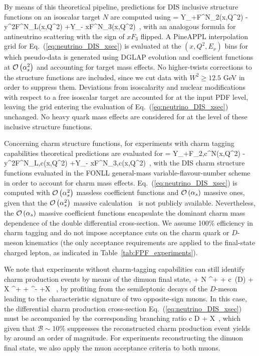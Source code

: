 By means of this theoretical pipeline, predictions for
DIS inclusive structure functions on an isoscalar target $N$ are computed
using
\be
\label{eq:neutrino_DIS_xsec}
 =  \lc Y_+F^{\nu N}_2(x,Q^2) - y^2F^{\nu N}_L(x,Q^2) +Y_- xF^{\nu N}_3(x,Q^2)\rc  \, ,
\ee
with an analogous formula for antineutrino scattering with the sign of $xF_3$ flipped.
%
A {\sc\small PineAPPL} interpolation grid for
Eq.~(\ref{eq:neutrino_DIS_xsec}) is evaluated at the $(x,Q^2,E_\nu)$ bins
for which pseudo-data is generated using DGLAP evolution and coefficient
functions at $\mathcal{O}\left( \alpha_s^2\right)$ and accounting for target mass effects.
%
No higher-twists corrections to the structure functions are included, since we cut
data with $W^2 \ge 12.5$ GeV in order to suppress them.
%
Deviations from isoscalarity and nuclear modifications with respect
to a free isoscalar target are accounted for at the input PDF level,
leaving the grid entering the evaluation of Eq.~(\ref{eq:neutrino_DIS_xsec}) unchanged.
%
No heavy quark mass effects are considered for at the level of these inclusive structure functions.

Concerning charm structure functions, for experiments with charm tagging
capabilities theoretical predictions are evaluated for
\be
\label{eq:neutrino_DIS_xsec}
 =  \lc Y_+F_{2,c}^{\nu N}(x,Q^2) - y^2F^{\nu N}_{L,c}(x,Q^2) +Y_- xF^{\nu N}_{3,c}(x,Q^2)\rc  \, ,
\ee
with the DIS charm structure functions evaluated in the FONLL general-mass variable-flavour-number
scheme~\cite{Forte:2010ta,Ball:2011mu,Faura:2020oom} in order to account for charm mass effects.
%
Eq.~(\ref{eq:neutrino_DIS_xsec}) is computed with $\mathcal{O}\left( \alpha_s^2\right)$ massless
coefficient functions and $\mathcal{O}\left( \alpha_s\right)$ massive ones, given
that the $\mathcal{O}\left( \alpha_s^2\right)$ massive calculation~\cite{Gao:2017kkx} is not publicly available.
%
Nevertheless, the $\mathcal{O}\left( \alpha_s\right)$ massive coefficient functions
encapsulate the dominant charm mass dependence of the double differential
cross-section.
%
We assume 100\% efficiency in charm tagging and do not impose acceptance cuts on the charm
quark or $D$-meson kinematics (the only acceptance requirements are applied to the final-state
charged lepton, as indicated in  Table~\ref{tab:FPF_experiments}).

We note that experiments without charm-tagging capabilities can still identify charm production
events by means of the dimuon final state,
\be
\nu + N \to \mu^+ + c~(\to D) + X \to \mu^+ + \mu^- +X \, ,
\ee
by profiting from the semileptonic decays of the $D$-meson leading
to the characteristic signature of two opposite-sign muons.
%
In this case, the  differential charm production cross-section Eq.~(\ref{eq:neutrino_DIS_xsec})
must be accompanied by the corresponding branching ratio
\be
{}\lp c \to D \to \mu + X\rp \, ,
\ee
which given that $\mathcal{B}\sim 10\%$ suppresses the reconstructed charm
production event yields by around an order of magnitude.
%
For experiments reconstructing the dimuon final state,
we also apply the muon acceptance criteria to both muons.

